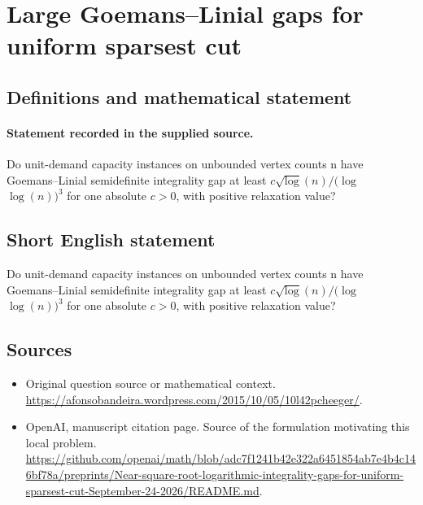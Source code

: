 \documentclass[11pt]{article}
\begin{document}
\section*{Large Goemans–Linial gaps for uniform sparsest cut}\label{statement}
\subsection{Definitions and mathematical statement}
\paragraph{Statement recorded in the supplied source.}
Do unit-demand capacity instances on unbounded vertex counts n have Goemans–Linial semidefinite integrality gap at least $c\surd \log (n)/(\log $ $\log (n))^{3}$ for one absolute $c>0$, with positive relaxation value?
\subsection{Short English statement}
Do unit-demand capacity instances on unbounded vertex counts n have Goemans–Linial semidefinite integrality gap at least $c\surd \log (n)/(\log $ $\log (n))^{3}$ for one absolute $c>0$, with positive relaxation value?
\subsection{Sources}
\begin{itemize}
\item[S1] Original question source or mathematical context.
\url{https://afonsobandeira.wordpress.com/2015/10/05/10l42pcheeger/}.
\item[S2] OpenAI, manuscript citation page. Source of the formulation motivating this local problem.
\url{https://github.com/openai/math/blob/adc7f1241b42e322a6451854ab7e4b4c146bf78a/preprints/Near-square-root-logarithmic-integrality-gaps-for-uniform-sparsest-cut-September-24-2026/README.md}.
\end{itemize}
\end{document}
